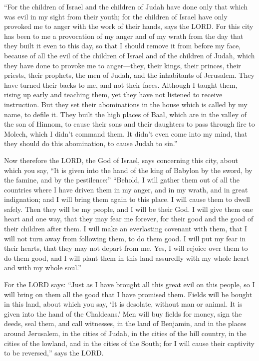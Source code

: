  ``For the children of Israel and the children of Judah
have done only that which was evil in my sight from their youth; for the
children of Israel have only provoked me to anger with the work of their
hands, says the LORD.  For this city has been to me a
provocation of my anger and of my wrath from the day that they built it
even to this day, so that I should remove it from before my face,
 because of all the evil of the children of Israel and of
the children of Judah, which they have done to provoke me to
anger---they, their kings, their princes, their priests, their prophets,
the men of Judah, and the inhabitants of Jerusalem.  They
have turned their backs to me, and not their faces. Although I taught
them, rising up early and teaching them, yet they have not listened to
receive instruction.  But they set their abominations in
the house which is called by my name, to defile it.  They
built the high places of Baal, which are in the valley of the son of
Hinnom, to cause their sons and their daughters to pass through fire to
Molech, which I didn't command them. It didn't even come into my mind,
that they should do this abomination, to cause Judah to sin.''

 Now therefore the LORD, the God of Israel, says concerning
this city, about which you say, ``It is given into the hand of the king
of Babylon by the sword, by the famine, and by the pestilence:''
 ``Behold, I will gather them out of all the countries
where I have driven them in my anger, and in my wrath, and in great
indignation; and I will bring them again to this place. I will cause
them to dwell safely.  Then they will be my people, and I
will be their God.  I will give them one heart and one way,
that they may fear me forever, for their good and the good of their
children after them.  I will make an everlasting covenant
with them, that I will not turn away from following them, to do them
good. I will put my fear in their hearts, that they may not depart from
me.  Yes, I will rejoice over them to do them good, and I
will plant them in this land assuredly with my whole heart and with my
whole soul.''

 For the LORD says: ``Just as I have brought all this great
evil on this people, so I will bring on them all the good that I have
promised them.  Fields will be bought in this land, about
which you say, `It is desolate, without man or animal. It is given into
the hand of the Chaldeans.'  Men will buy fields for money,
sign the deeds, seal them, and call witnesses, in the land of Benjamin,
and in the places around Jerusalem, in the cities of Judah, in the
cities of the hill country, in the cities of the lowland, and in the
cities of the South; for I will cause their captivity to be reversed,''
says the LORD.


